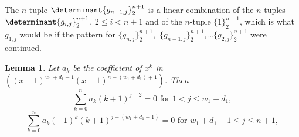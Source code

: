 \documentclass[10pt,reqno]{amsart}
\theoremstyle{plain}
\newtheorem{Lem}[Thm]{Lemma}
\theoremstyle{definition}
\theoremstyle{remark}
\begin{document}
The $n$-tuple $\determinant{g_{n+1,j}}_2^{n+1}$ is a linear combination of
the $n$-tuples $\determinant{g_{i,j}}_2^{n+1}$, $2\leq i<n+1$ and of
the $n$-tuple $\{1\}_2^{n+1}$, which is what $g_{1,j}$ would
be if the pattern for $\{g_{n,j}\}_2^{n+1},$
$\{g_{n-1,j}\}_2^{n+1},$\dots $\{g_{2,j}\}_2^{n+1}$ were
continued.

\begin{Lem}\label{Lem:kato}
Let $a_k$ be the
coefficient of $x^k$ in $((x-1)^{w_1+d_1-1} (x+1)^{n-(w_1+d_1)+1})$. Then
\begin{equation}
\sum_{k=0}^{n} a_k (k+1)^{j-2} = 0 \text{ for } 1<j\leq w_1+d_1,
\end{equation}
\begin{equation}
\sum_{k=0}^{n} a_k (-1)^k (k+1)^{j-(w_1+d_1+1)} = 0 
\text{ for } w_1+d_1+1\leq j\leq n+1,
\end{equation}
\end{Lem}
\end{document}

